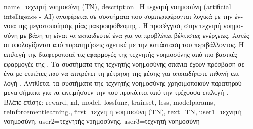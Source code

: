 {name={\foreignlanguage{greek}{τεχνητή νοημοσύνη (ΤΝ)}}, 
	description={\foreignlanguage{greek}{Η τεχνητή νοημοσύνη} (artificial intelligence - AI) 
		\foreignlanguage{greek}{αναφέρεται σε συστήματα που συμπεριφέρονται λογικά με την έννοια της  
		μεγιστοποίησης μίας μακροπρόθεσμης} . \foreignlanguage{greek}{Η προσέγγιση στην τεχνητή νοημοσύνη με βάση
		τη}  \foreignlanguage{greek}{είναι να εκπαιδευτεί ένα}  \foreignlanguage{greek}{για   
		να προβλέπει βέλτιστες ενέργειες. Αυτές οι}  \foreignlanguage{greek}{υπολογίζονται από 
		παρατηρήσεις σχετικά με την κατάσταση του περιβάλλοντος. Η επιλογή της} 
		 \foreignlanguage{greek}{διαφοροποιεί τις εφαρμογές της τεχνητής νοημοσύνης από πιο βασικές  
		εφαρμογές της} . \foreignlanguage{greek}{Τα συστήματα της τεχνητής νοημοσύνης σπάνια έχουν 
		πρόσβαση σε ένα}  \foreignlanguage{greek}{με ετικέτες που να επιτρέπει τη μέτρηση της 
		μέσης}  \foreignlanguage{greek}{για οποιαδήποτε πιθανή επιλογή} . 
		\foreignlanguage{greek}{Αντίθετα, τα συστήματα της τεχνητής νοημοσύνης χρησιμοποιούν παρατηρούμενα σήματα}  
		 \foreignlanguage{greek}{για να εκτιμήσουν την}  \foreignlanguage{greek}{που 
		προκύπτει από την τρέχουσα επιλογή} .\\
		\foreignlanguage{greek}{Βλέπε επίσης:} \gls{reward}, \gls{ml}, \gls{model}, \gls{lossfunc}, \gls{trainset}, \gls{loss}, \gls{modelparams}, \gls{reinforcementlearning}.},
	first={\foreignlanguage{greek}{τεχνητή νοημοσύνη (ΤΝ)}},
	text={\foreignlanguage{greek}{ΤΝ}},
	user1={\foreignlanguage{greek}{τεχνητή νοημοσύνη}}, %
	user2={\foreignlanguage{greek}{τεχνητής νοημοσύνης}}, %
	user3={\foreignlanguage{greek}{τεχνητή νοημοσύνη}} %
}

